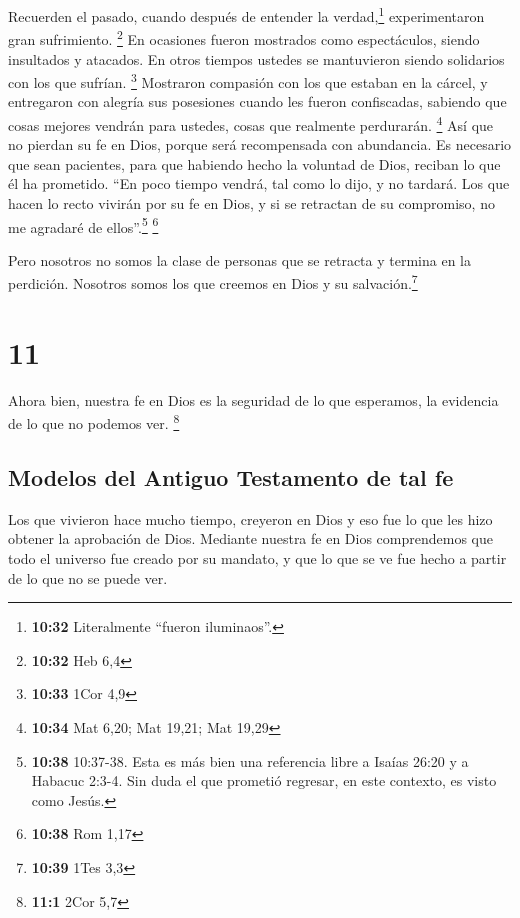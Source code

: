  Recuerden el pasado, cuando después de entender la
verdad,\footnote{\textbf{10:32} Literalmente ``fueron iluminaos''.}
experimentaron gran sufrimiento. \footnote{\textbf{10:32} Heb 6,4}
 En ocasiones fueron mostrados como espectáculos, siendo
insultados y atacados. En otros tiempos ustedes se mantuvieron siendo
solidarios con los que sufrían. \footnote{\textbf{10:33} 1Cor 4,9}
 Mostraron compasión con los que estaban en la cárcel, y
entregaron con alegría sus posesiones cuando les fueron confiscadas,
sabiendo que cosas mejores vendrán para ustedes, cosas que realmente
perdurarán. \footnote{\textbf{10:34} Mat 6,20; Mat 19,21; Mat 19,29}
 Así que no pierdan su fe en Dios, porque será
recompensada con abundancia.  Es necesario que sean
pacientes, para que habiendo hecho la voluntad de Dios, reciban lo que
él ha prometido.  ``En poco tiempo vendrá, tal como lo
dijo, y no tardará.  Los que hacen lo recto vivirán por
su fe en Dios, y si se retractan de su compromiso, no me agradaré de
ellos''.\footnote{\textbf{10:38} 10:37-38. Esta es más bien una
  referencia libre a Isaías 26:20 y a Habacuc 2:3-4. Sin duda el que
  prometió regresar, en este contexto, es visto como Jesús.} \footnote{\textbf{10:38}
  Rom 1,17}

 Pero nosotros no somos la clase de personas que se
retracta y termina en la perdición. Nosotros somos los que creemos en
Dios y su salvación.\footnote{\textbf{10:39} 1Tes 3,3}

\hypertarget{section-10}{%
\section{11}\label{section-10}}

 Ahora bien, nuestra fe en Dios es la seguridad de lo que
esperamos, la evidencia de lo que no podemos ver. \footnote{\textbf{11:1}
  2Cor 5,7}

\hypertarget{modelos-del-antiguo-testamento-de-tal-fe}{%
\subsection{Modelos del Antiguo Testamento de tal
fe}\label{modelos-del-antiguo-testamento-de-tal-fe}}

 Los que vivieron hace mucho tiempo, creyeron en Dios y
eso fue lo que les hizo obtener la aprobación de Dios. 
Mediante nuestra fe en Dios comprendemos que todo el universo fue creado
por su mandato, y que lo que se ve fue hecho a partir de lo que no se
puede ver.

